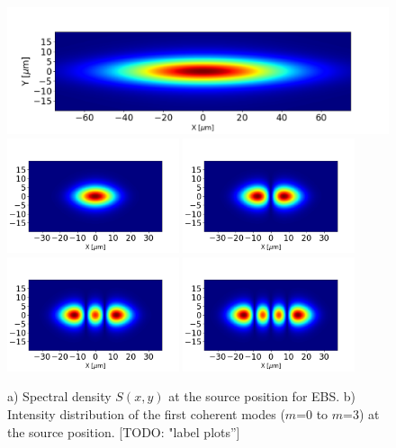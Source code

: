 \documentclass{iucr}              %
\newcommand{\todo}[1]{{\color{red}[TODO: "#1'']}}
\begin{document}
\begin{figure}\label{fig:spectraldensity}
    \centering
        \includegraphics[width=\textwidth]{GRAPHICS/ebs_spectral_density.png}
        \includegraphics[width=0.45\textwidth]{GRAPHICS/ebs_mode0.png}
        \includegraphics[width=0.45\textwidth]{GRAPHICS/ebs_mode1.png}
        \includegraphics[width=0.45\textwidth]{GRAPHICS/ebs_mode2.png}
        \includegraphics[width=0.45\textwidth]{GRAPHICS/ebs_mode3.png}
    \caption{a) Spectral density $S(x,y)$ at the source position for EBS. b) Intensity distribution of the first coherent modes ($m$=0 to $m$=3) at the source position.
    \todo{label plots}
    }
\end{figure}
\end{document}
